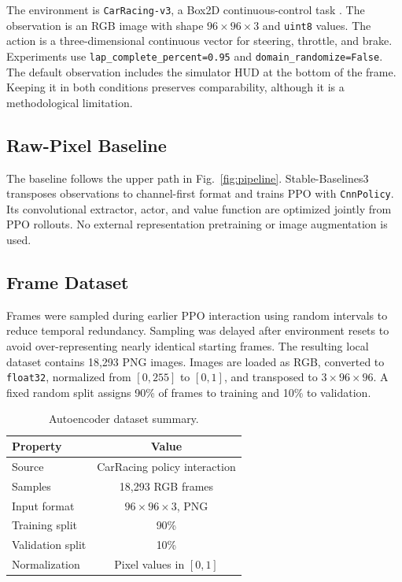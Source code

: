 \documentclass[10pt,twocolumn,a4paper]{article}
\begin{document}
The environment is \texttt{CarRacing-v3}, a Box2D continuous-control task
\cite{gymnasium_carracing}. The observation is an RGB image with shape
$96\times96\times3$ and \texttt{uint8} values. The action is a three-dimensional
continuous vector for steering, throttle, and brake. Experiments use
\texttt{lap\_complete\_percent=0.95} and
\texttt{domain\_randomize=False}. The default observation includes the
simulator HUD at the bottom of the frame. Keeping it in both conditions preserves
comparability, although it is a methodological limitation.

\subsection{Raw-Pixel Baseline}

The baseline follows the upper path in Fig.~\ref{fig:pipeline}. Stable-Baselines3
\cite{stable_baselines3} transposes observations to channel-first format and
trains PPO with \texttt{CnnPolicy}. Its convolutional extractor, actor, and value
function are optimized jointly from PPO rollouts. No external representation
pretraining or image augmentation is used.

\subsection{Frame Dataset}

Frames were sampled during earlier PPO interaction using random intervals to
reduce temporal redundancy. Sampling was delayed after environment resets to
avoid over-representing nearly identical starting frames. The resulting local
dataset contains 18,293 PNG images. Images are loaded as RGB, converted to
\texttt{float32}, normalized from $[0,255]$ to $[0,1]$, and transposed to
$3\times96\times96$. A fixed random split assigns 90\% of frames to training and
10\% to validation.

\begin{table}[t]
\centering
\caption{Autoencoder dataset summary.}
\label{tab:dataset}
\begin{tabular}{lc}
\toprule
\textbf{Property} & \textbf{Value}\\
\midrule
Source & CarRacing policy interaction\\
Samples & 18,293 RGB frames\\
Input format & $96\times96\times3$, PNG\\
Training split & 90\%\\
Validation split & 10\%\\
Normalization & Pixel values in $[0,1]$\\
\bottomrule
\end{tabular}
\end{table}
\end{document}
